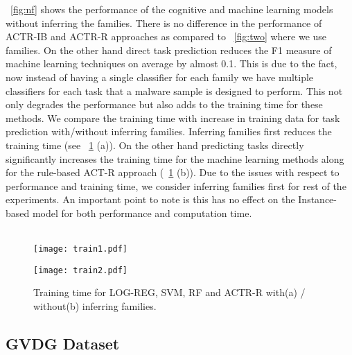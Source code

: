 \documentclass[conference]{IEEEtran}
\begin{document}
\figurename~\ref{fig:nf} shows the performance of the cognitive and machine learning models without inferring the families. There is no difference in the performance of ACTR-IB and ACTR-R approaches as compared to \figurename~\ref{fig:two} where we use families.  On the other hand direct task prediction reduces the F1 measure of machine learning techniques on average by almost 0.1. This is due to the fact, now instead of having a single classifier for each family we have multiple classifiers for each task that a malware sample is designed to perform. This not only degrades the performance but also adds to the training time for these methods. We compare the training time with increase in training data for task prediction with/without inferring families. Inferring families first reduces the training time (see \figurename~\ref{t} (a)).  On the other hand predicting tasks directly significantly increases the training time for the machine learning methods along for the rule-based ACT-R approach (\figurename~\ref{t} (b)). Due to the issues with respect to performance and training time, we consider inferring families first for rest of the experiments. An important point to note is this has no effect on the Instance-based model for both performance and computation time.\\\\
\vspace{-2em}
\begin{figure}[ht]
	
	\centering
	\begin{minipage}[t]{0.47\linewidth}
	
		\texttt{[image: train1.pdf]}
		\label{fig:minipage1}
	\end{minipage}
	\quad
	\begin{minipage}[t]{0.47\linewidth}
		
		\texttt{[image: train2.pdf]}
		\label{fig:minipage2}
	\end{minipage}
	\vspace{-1em}
	\caption{\textmd{Training time for LOG-REG, SVM, RF and ACTR-R with(a) / without(b) inferring families.}}
	\label{t}
\end{figure}
\vspace{-2em}

\subsection{GVDG Dataset}
\end{document}
